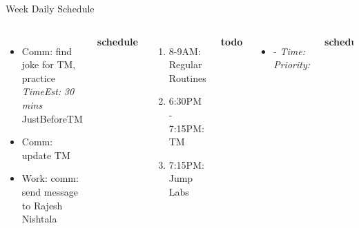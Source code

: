 \documentclass[serif, mathserif, final]{beamer}
\newcommand{\timeEst}[1]{\textit{Time:} \textit{#1}}
\newcommand{\te}[1]{\textit{TimeEst:} \textit{#1}}
\newcommand{\priority}[1]{\textit{Priority:} \textit{#1}}
\newcommand{\deadline}[1]{#1}
\newcommand{\dl}[1]{#1}
\begin{document}
\begin{frame}{}
\begin{columns}
\begin{column}{0.50\linewidth}
\begin{block}{Week Daily Schedule}
\begin{columns}
\begin{itemize}
  \item \tiny Comm: find joke for TM, practice \te {30 mins} \dl
    {JustBeforeTM}

  \item \tiny Comm: update TM 
  \item \tiny Work: comm: send message to Rajesh Nishtala
  \end{itemize}
  \textbf{\small schedule}\\
  \begin{enumerate} 
    \tiny \item \tiny 8-9AM: Regular Routines 
    \tiny \item 6:30PM - 7:15PM: TM 
    \tiny \item 7:15PM: Jump Labs 
  \end{enumerate} 
  
  \textbf{\small todo}\\ 
  \begin{itemize}
    \tiny \item \tiny -  \deadline{ }   \timeEst{}  \priority{} 
  \end{itemize}
  \textbf{\small schedule}\\
  \begin{enumerate}
    \tiny \item \tiny 8-9AM: Regular Routines 
  \end{enumerate}
  
  \textbf{\small todo}\\
  \begin{itemize}
    \tiny \item \tiny Work:  
  \item \tiny 
  \item \tiny 
  \item \tiny Comm: 
  \end{itemize}
  \textbf{\small schedule}\\ 
  \begin{enumerate}
    \tiny \item \tiny 8-9AM: Regular Routines 
  \end{enumerate}
  
  \textbf{\small todo}\\
  \begin{itemize}
  \item \tiny Work: 
    \item \tiny Work: make schedule for paper and send 
    \item \tiny Comm: talk to Atul about life
    \item \tiny Mgmt: webpresence: update on whatsapp  
    \item \tiny Mgmt: webpresence: message on fb 


\end{itemize}
\end{columns}
\end{block}
\end{column}
\end{columns}
\end{frame}
\end{document}
